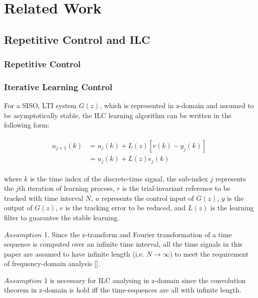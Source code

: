 \chapter{Related Work}
\label{ch:related_work}

\section{Repetitive Control and ILC}
\label{sec: Repetitive Control and ILC}


\subsection{Repetitive Control}
\label{sec: Repetitive Control}

\subsection{Iterative Learning Control}
\label{sec: Iterative Learning Control}

  For a SISO, LTI system $G(z)$, which is represented in z-domain and assumed to be asymptotically stable, the ILC learning algorithm can be written in the following form:

\begin{align}
\begin{split}
u_{j+1}(k)& = u_j(k)+L(z)[r(k)-y_j(k)]\\
& = u_j(k)+L(z)e_j(k)
\end{split}
\label{eq:ILClaw}
\end{align}


where $k$ is the time index of the discrete-time signal, the sub-index $j$ represents the $j$th iteration of learning process, $r$ is the trial-invariant reference to be tracked with time interval $N$, $u$ represents the control input of $G(z)$, $y$ is the output of  $G(z)$, $e$ is the tracking error to be reduced, and $L(z)$ is the learning filter to guarantee the stable learning.
 
{$Assumption$ 1.}
Since the z-transform and Fourier transformation of a time sequence is computed over an infinite time interval, all the time signals in this paper are assumed to have infinite length (i.e. $N$$\rightarrow$$\infty$) to meet the requirement of frequency-domain analysis [\cite{silverman1973deconvolution}]. 

$Assumption$ 1 is necessary for ILC analysing in z-domain since the convolution theorem in z-domain is hold iff the time-sequences are all with infinite length.


